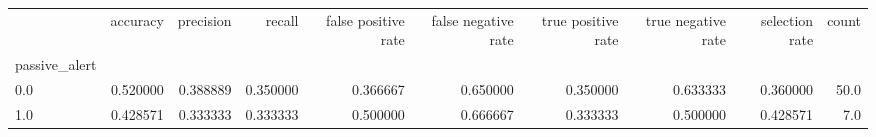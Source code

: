 \begin{tabular}{lrrrrrrrrr}
\toprule
{} &  accuracy &  precision &    recall &  false positive rate &  false negative rate &  true positive rate &  true negative rate &  selection rate &  count \\
passive\_alert &           &            &           &                      &                      &                     &                     &                 &        \\
\midrule
0.0           &  0.520000 &   0.388889 &  0.350000 &             0.366667 &             0.650000 &            0.350000 &            0.633333 &        0.360000 &   50.0 \\
1.0           &  0.428571 &   0.333333 &  0.333333 &             0.500000 &             0.666667 &            0.333333 &            0.500000 &        0.428571 &    7.0 \\
\bottomrule
\end{tabular}
